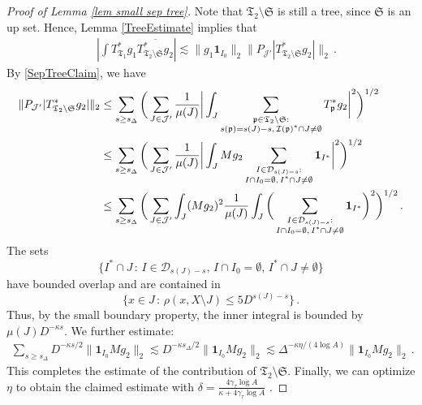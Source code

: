 \begin{proof}[Proof of Lemma \ref{lem small sep tree}]
    Note that $\mathfrak{T}_2 \setminus \mathfrak{S}$ is still a tree, since $\mathfrak{S}$ is an up set.
    Hence, Lemma \ref{TreeEstimate} implies that
    \begin{align*}
        \quad\left| \int T_{\mathfrak{T}_1}^* g_1 \overline{T_{\mathfrak{T}_2 \setminus \mathfrak{S}}^* g_2} \right|\lesssim \|g_1\mathbf{1}_{I_0}\|_2 \|P_{\mathcal{J}'}|T_{\mathfrak{T}_2 \setminus \mathfrak{S}}^* g_2|\|_2\,.
    \end{align*}
    By \eqref{SepTreeClaim}, we have
    \begin{align*}
        \|P_{\mathcal{J}'}|T_{\mathfrak{T}_2 \setminus \mathfrak{S}}^* g_2|\|_2
        &\leq \sum_{s \geq s_\Delta} \bigg(\sum_{J \in \mathcal{J}'} \frac{1}{\mu(J)} \bigg|\int_J\sum_{\substack{\mathfrak p \in \mathfrak{T}_2 \setminus \mathfrak{S}:\\ s(\mathfrak p) = s(J) - s,\, \mathcal{I}(\mathfrak p)^* \cap J \neq \emptyset}} T_{\mathfrak p}^* g_2\bigg|^2\bigg)^{1/2}\\
        &\leq \sum_{s \geq s_\Delta} \bigg(\sum_{J \in \mathcal{J}'} \frac{1}{\mu(J)} \bigg|\int_J Mg_2 \sum_{\substack{I \in \mathcal{D}_{s(J) - s}:\\ I\cap I_0 = \emptyset,\, I^* \cap J \neq \emptyset}}  \mathbf{1}_{I^*}\bigg|^2\bigg)^{1/2}\\
        &\leq \sum_{s \geq s_\Delta} \bigg(\sum_{J \in \mathcal{J}'}  \int_J (Mg_2)^2  \frac{1}{\mu(J)}\int_J\bigg(\sum_{\substack{I \in \mathcal{D}_{s(J) - s}:\\ I\cap I_0 = \emptyset,\, I^* \cap J \neq \emptyset}}  \mathbf{1}_{I^*}\bigg)^2 \bigg)^{1/2}\,.
    \end{align*}
    The sets
    $$
        \{I^* \cap J \, : \, I \in \mathcal{D}_{s(J) - s},\, I\cap I_0 = \emptyset,\, I^* \cap J \neq \emptyset\}
    $$
    have bounded overlap and are contained in
    $$
        \{x \in J \, : \, \rho(x, X \setminus J) \leq 5 D^{s(J)-s}\}\,.
    $$
    Thus, by the small boundary property, the inner integral is bounded by $\mu(J) D^{-\kappa s}$. We further estimate:
    \begin{align*}
            \sum_{s \geq s_\Delta} D^{-\kappa s/2} \|\mathbf{1}_{I_0}Mg_2\|_2 \lesssim D^{-\kappa s_\Delta/2} \|\mathbf{1}_{I_0}Mg_2\|_2 \lesssim \Delta^{-\kappa \eta/(4 \log A)} \|\mathbf{1}_{I_0}Mg_2\|_2\,.
    \end{align*}
    This completes the estimate of the contribution of $\mathfrak{T}_2 \setminus \mathfrak{S}$. Finally, we can optimize $\eta$ to obtain the claimed estimate with $\delta = \frac{4 \gamma_{\tau} \log A }{\kappa + 4 \gamma_{\tau} \log A }$ .
\end{proof}






